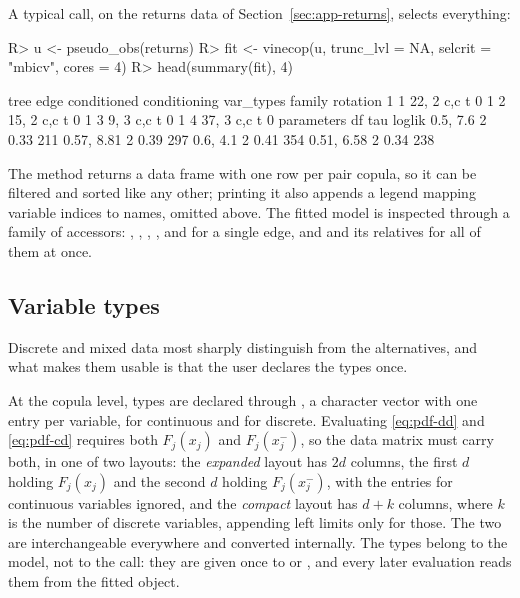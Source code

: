 \documentclass[article]{jss}
\begin{document}
A typical call, on the returns data of Section~\ref{sec:app-returns}, selects
everything:

\begin{CodeChunk}
\begin{CodeInput}
R> u <- pseudo_obs(returns)
R> fit <- vinecop(u, trunc_lvl = NA, selcrit = "mbicv", cores = 4)
R> head(summary(fit), 4)
\end{CodeInput}
\begin{CodeOutput}
 tree edge conditioned conditioning var_types family rotation
    1    1       22, 2                    c,c      t        0
    1    2       15, 2                    c,c      t        0
    1    3        9, 3                    c,c      t        0
    1    4       37, 3                    c,c      t        0
 parameters df  tau loglik
   0.5, 7.6  2 0.33    211
 0.57, 8.81  2 0.39    297
   0.6, 4.1  2 0.41    354
 0.51, 6.58  2 0.34    238
\end{CodeOutput}
\end{CodeChunk}

The  method returns a data frame with one row per pair copula,
so it can be filtered and sorted like any other; printing it also appends a
legend mapping variable indices to names, omitted above.  The fitted model is inspected
through a family of accessors:
, , ,
,  and  for a
single edge, and  and its relatives for all of
them at once.

\subsection{Variable types}\label{sec:vartypes}

Discrete and mixed data most sharply distinguish  from the
alternatives, and what makes them usable is that the user declares the types
once.

At the copula level, types are declared through , a character
vector with one entry per variable,  for continuous and 
for discrete.  Evaluating \eqref{eq:pdf-dd} and \eqref{eq:pdf-cd} requires both
$F_j(x_j)$ and $F_j(x_j^-)$, so the data matrix must carry both, in one of
two layouts: the \emph{expanded} layout has $2d$ columns, the first $d$
holding $F_j(x_j)$ and the second $d$ holding $F_j(x_j^-)$, with the entries
for continuous variables ignored, and the \emph{compact} layout has $d + k$
columns, where $k$ is the number of discrete variables, appending left limits
only for those.  The two are interchangeable everywhere and converted
internally.  The types belong to the model, not to the call: they are given once to  or
, and every later evaluation reads them from the fitted object.
\end{document}
